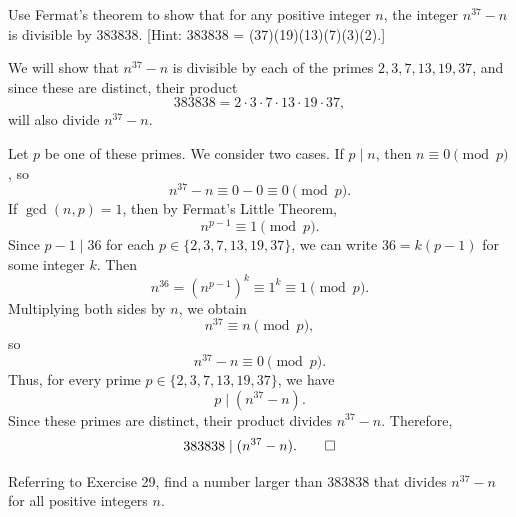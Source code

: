 \begin{problem}[24.29]
  Use Fermat's theorem to show that for any positive integer $n$, the integer $n^{37} - n$ is divisible by 383838. [Hint: 383838 = (37)(19)(13)(7)(3)(2).]
\end{problem}

\begin{solution}
  We will show that $n^{37} - n$ is divisible by each of the primes $2, 3, 7, 13, 19, 37$, and since these are distinct, their product
  \[%
    383838 = 2 \cdot 3 \cdot 7 \cdot 13 \cdot 19 \cdot 37
  ,\]%
  will also divide $n^{37} - n$.

  Let $p$ be one of these primes. We consider two cases. If $p \mid n$, then $n \equiv 0 \pmod{p}$, so
  \[%
    n^{37} - n \equiv 0 - 0 \equiv 0 \pmod{p}
  .\]%
  If $\gcd(n,p) = 1$, then by Fermat's Little Theorem,
  \[%
    n^{p-1} \equiv 1 \pmod{p}
  .\]%
  Since $p - 1 \mid 36$ for each $p \in \{2, 3, 7, 13, 19, 37\}$, we can write $36 = k(p - 1)$ for some integer $k$. Then
  \[%
    n^{36} = (n^{p-1})^k \equiv 1^k \equiv 1 \pmod{p}
  .\]%
  Multiplying both sides by $n$, we obtain
  \[%
    n^{37} \equiv n \pmod{p}
  ,\]%
  so
  \[%
    n^{37} - n \equiv 0 \pmod{p}
  .\]%
  Thus, for every prime $p \in \{2,3,7,13,19,37\}$, we have
  \[%
    p \mid (n^{37} - n)
  .\]%
  Since these primes are distinct, their product divides $n^{37} - n$. Therefore,
  \[%
    383838 \mid (n^{37} - n)
  .\qedhere\]%
\end{solution}

\begin{problem}[24.30]
  Referring to Exercise 29, find a number larger than 383838 that divides $n^{37} - n$ for all positive integers $n$.
\end{problem}

